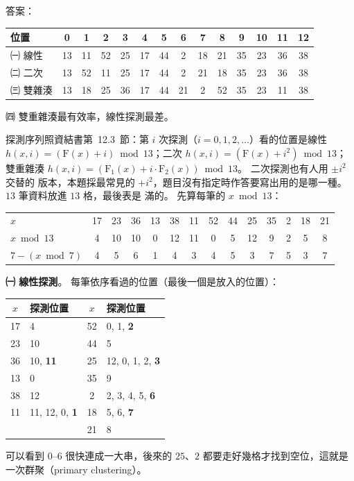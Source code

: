 \begin{pastsoln}
答案：
\begin{center}
\small
\setlength{\tabcolsep}{4pt}
\begin{tabular}{l*{13}{c}}
\toprule
位置 & 0 & 1 & 2 & 3 & 4 & 5 & 6 & 7 & 8 & 9 & 10 & 11 & 12 \\
\midrule
㈠ 線性 & 13 & 11 & 52 & 25 & 17 & 44 & 2 & 18 & 21 & 35 & 23 & 36 & 38 \\
㈡ 二次 & 13 & 52 & 11 & 25 & 17 & 44 & 2 & 21 & 18 & 35 & 23 & 36 & 38 \\
㈢ 雙雜湊 & 13 & 18 & 25 & 36 & 17 & 44 & 21 & 2 & 52 & 35 & 23 & 11 & 38 \\
\bottomrule
\end{tabular}
\end{center}
㈣ 雙重雜湊最有效率，線性探測最差。

探測序列照資結書第~12.3~節：第 $i$ 次探測（$i = 0, 1, 2, \ldots$）看的位置是線性
$h(x, i) = (\mathrm{F}(x) + i) \bmod 13$；二次 $h(x, i) = (\mathrm{F}(x) + i^2) \bmod 13$；雙重雜湊
$h(x, i) = (\mathrm{F}_1(x) + i \cdot \mathrm{F}_2(x)) \bmod 13$。 二次探測也有人用 $\pm i^2$ 交替的
版本，本題採最常見的 $+i^2$，題目沒有指定時作答要寫出用的是哪一種。 $13$ 筆資料放進 $13$ 格，最後表是
滿的。 先算每筆的 $x \bmod 13$：
\begin{center}
\small
\setlength{\tabcolsep}{4pt}
\begin{tabular}{l*{13}{c}}
\toprule
$x$ & 17 & 23 & 36 & 13 & 38 & 11 & 52 & 44 & 25 & 35 & 2 & 18 & 21 \\
$x \bmod 13$ & 4 & 10 & 10 & 0 & 12 & 11 & 0 & 5 & 12 & 9 & 2 & 5 & 8 \\
$7 - (x \bmod 7)$ & 4 & 5 & 6 & 1 & 4 & 3 & 4 & 5 & 3 & 7 & 5 & 3 & 7 \\
\bottomrule
\end{tabular}
\end{center}

\textbf{㈠ 線性探測}。 每筆依序看過的位置（最後一個是放入的位置）：
\begin{center}
\small
\begin{tabular}{cl|cl}
$x$ & 探測位置 & $x$ & 探測位置 \\
\hline
17 & 4 & 52 & 0, 1, \textbf{2} \\
23 & 10 & 44 & 5 \\
36 & 10, \textbf{11} & 25 & 12, 0, 1, 2, \textbf{3} \\
13 & 0 & 35 & 9 \\
38 & 12 & 2 & 2, 3, 4, 5, \textbf{6} \\
11 & 11, 12, 0, \textbf{1} & 18 & 5, 6, \textbf{7} \\
   &                      & 21 & 8 \\
\end{tabular}
\end{center}
可以看到 $0$--$6$ 很快連成一大串，後來的 $25$、$2$ 都要走好幾格才找到空位，這就是一次群聚（primary
clustering）。


\end{pastsoln}

